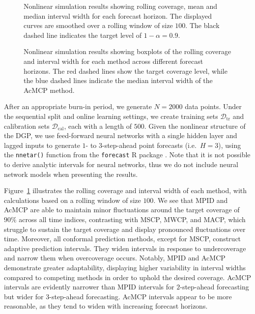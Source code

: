 \documentclass[
  11pt,
  12pt]{article}
\theoremstyle{plain}
\theoremstyle{remark}
\begin{document}
\begin{figure}[!b]


\caption{\label{fig-NL_cov}Nonlinear simulation results showing rolling
coverage, mean and median interval width for each forecast horizon. The
displayed curves are smoothed over a rolling window of size \(100\). The
black dashed line indicates the target level of \(1-\alpha=0.9\).}

\end{figure}%

\begin{figure}[!b]


\caption{\label{fig-NL_box}Nonlinear simulation results showing boxplots
of the rolling coverage and interval width for each method across
different forecast horizons. The red dashed lines show the target
coverage level, while the blue dashed lines indicate the median interval
width of the AcMCP method.}

\end{figure}%

After an appropriate burn-in period, we generate \(N=2000\) data points.
Under the sequential split and online learning settings, we create
training sets \(\mathcal{D}_{\text{tr}}\) and calibration sets
\(\mathcal{D}_{\text{cal}}\), each with a length of \(500\). Given the
nonlinear structure of the DGP, we use feed-forward neural networks with
a single hidden layer and lagged inputs to generate \(1\)- to
\(3\)-step-ahead point forecasts (i.e.~\(H=3\)), using the
\texttt{nnetar()} function from the \texttt{forecast} R package
\citep{hyndman2024}. Note that it is not possible to derive analytic
intervals for neural networks, thus we do not include neural network
models when presenting the results.

Figure~\ref{fig-NL_cov} illustrates the rolling coverage and interval
width of each method, with calculations based on a rolling window of
size \(100\). We see that MPID and AcMCP are able to maintain minor
fluctuations around the target coverage of \(90\%\) across all time
indices, contrasting with MSCP, MWCP, and MACP, which struggle to
sustain the target coverage and display pronounced fluctuations over
time. Moreover, all conformal prediction methods, except for MSCP,
construct adaptive prediction intervals. They widen intervals in
response to undercoverage and narrow them when overcoverage occurs.
Notably, MPID and AcMCP demonstrate greater adaptability, displaying
higher variability in interval widths compared to competing methods in
order to uphold the desired coverage. AcMCP intervals are evidently
narrower than MPID intervals for \(2\)-step-ahead forecasting but wider
for \(3\)-step-ahead forecasting. AcMCP intervals appear to be more
reasonable, as they tend to widen with increasing forecast horizons.
\end{document}
